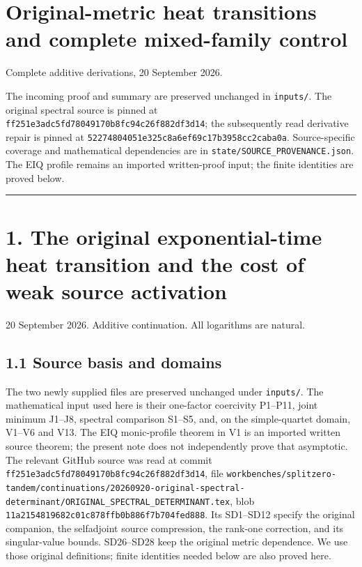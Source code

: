 \section{Original-metric heat transitions and complete mixed-family control}\label{original-metric-heat-transitions-and-complete-mixed-family-control}

Complete additive derivations, 20 September 2026.

The incoming proof and summary are preserved unchanged in \texttt{inputs/}. The original spectral source is pinned at \texttt{ff251e3adc5fd78049170b8fc94c26f882df3d14}; the subsequently read derivative repair is pinned at \texttt{52274804051e325c8a6ef69c17b3958cc2caba0a}. Source-specific coverage and mathematical dependencies are in \texttt{state/SOURCE\_PROVENANCE.json}. The EIQ profile remains an imported written-proof input; the finite identities are proved below.

\begin{center}\rule{0.5\linewidth}{0.5pt}\end{center}

\section{1. The original exponential-time heat transition and the cost of weak source activation}\label{the-original-exponential-time-heat-transition-and-the-cost-of-weak-source-activation}

20 September 2026. Additive continuation. All logarithms are natural.

\subsection{1.1 Source basis and domains}\label{source-basis-and-domains}

The two newly supplied files are preserved unchanged under \texttt{inputs/}. The mathematical input used here is their one-factor coercivity P1--P11, joint minimum J1--J8, spectral comparison S1--S5, and, on the simple-quartet domain, V1--V6 and V13. The EIQ monic-profile theorem in V1 is an imported written source theorem; the present note does not independently prove that asymptotic. The relevant GitHub source was read at commit \texttt{ff251e3adc5fd78049170b8fc94c26f882df3d14}, file \texttt{workbenches/splitzero-tandem/continuations/20260920-original-spectral-determinant/ORIGINAL\_SPECTRAL\_DETERMINANT.tex}, blob \texttt{11a2154819682c01c878ffb0b886f7b704fed888}. Its SD1--SD12 specify the original companion, the selfadjoint source compression, the rank-one correction, and its singular-value bounds. SD26--SD28 keep the original metric dependence. We use those original definitions; finite identities needed below are also proved here.

